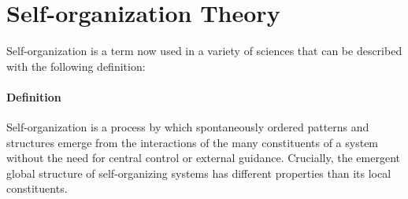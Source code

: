 \section{Self-organization Theory}
\label{sec:self-orga}
Self-organization is a term now used in a variety of sciences that can be described with the following definition:
\begin{tcolorbox}
\small
\paragraph{Definition}
\gls{Self-organization} is a process by which spontaneously ordered patterns and structures emerge from the interactions of the many constituents of a system without the need for central control or external guidance. Crucially, the emergent global structure of self-organizing systems has different properties than its local constituents.
\end{tcolorbox}

